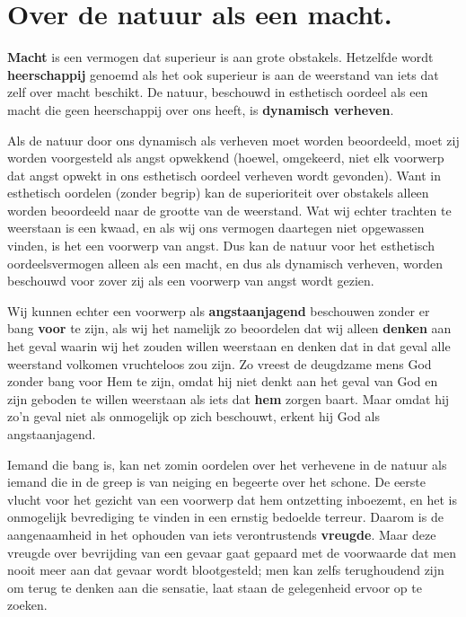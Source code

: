 \section{Over de natuur als een macht.}

\textbf{Macht} is een vermogen dat superieur is aan grote obstakels. Hetzelfde wordt \textbf{heerschappij} genoemd als het ook superieur is aan de weerstand van iets dat zelf over macht beschikt. De natuur, beschouwd in esthetisch oordeel als een macht die geen heerschappij over ons heeft, is \textbf{dynamisch verheven}.

Als de natuur door ons dynamisch als verheven moet worden beoordeeld, moet zij worden voorgesteld als angst opwekkend (hoewel, omgekeerd, niet elk voorwerp dat angst opwekt in ons esthetisch oordeel verheven wordt gevonden). Want in esthetisch oordelen (zonder begrip) kan de superioriteit over obstakels alleen worden beoordeeld naar de grootte van de weerstand. Wat wij echter trachten te weerstaan is een kwaad, en als wij ons vermogen daartegen niet opgewassen vinden, is het een voorwerp van angst. Dus kan de natuur voor het esthetisch oordeelsvermogen alleen als een macht, en dus als dynamisch verheven, worden beschouwd voor zover zij als een voorwerp van angst wordt gezien.

Wij kunnen echter een voorwerp als \textbf{angstaanjagend} beschouwen zonder er bang \textbf{voor} te zijn, als wij het namelijk zo beoordelen dat wij alleen \textbf{denken} aan het geval waarin wij het zouden willen weerstaan en denken dat in dat geval alle weerstand volkomen vruchteloos zou zijn. Zo vreest de deugdzame mens God zonder bang voor Hem te zijn, omdat hij niet denkt aan het geval van God en zijn geboden te willen weerstaan als iets dat \textbf{hem} zorgen baart. Maar omdat hij zo’n geval niet als onmogelijk op zich beschouwt, erkent hij God als angstaanjagend.

Iemand die bang is, kan net zomin oordelen over het verhevene in de natuur als iemand die in de greep is van neiging en begeerte over het schone. De eerste vlucht voor het gezicht van een voorwerp dat hem ontzetting inboezemt, en het is onmogelijk bevrediging te vinden in een ernstig bedoelde terreur. Daarom is de aangenaamheid in het ophouden van iets verontrustends \textbf{vreugde}. Maar deze vreugde over bevrijding van een gevaar gaat gepaard met de voorwaarde dat men nooit meer aan dat gevaar wordt blootgesteld; men kan zelfs terughoudend zijn om terug te denken aan die sensatie, laat staan de gelegenheid ervoor op te zoeken.

